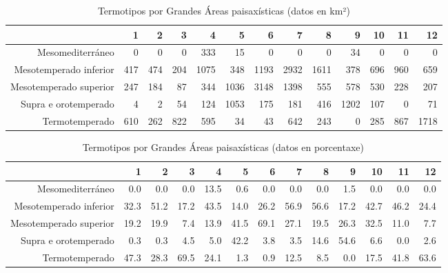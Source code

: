 \begin{table}[p]
\centering
\caption{Termotipos por Grandes Áreas paisaxísticas (datos en km²)} 
\label{xtaboa3}
\begin{tabular}{rrrrrrrrrrrrr}
  \hline
 & 1 & 2 & 3 & 4 & 5 & 6 & 7 & 8 & 9 & 10 & 11 & 12 \\ 
  \hline
Mesomediterráneo & 0 & 0 & 0 & 333 & 15 & 0 & 0 & 0 & 34 & 0 & 0 & 0 \\ 
  Mesotemperado inferior & 417 & 474 & 204 & 1075 & 348 & 1193 & 2932 & 1611 & 378 & 696 & 960 & 659 \\ 
  Mesotemperado superior & 247 & 184 & 87 & 344 & 1036 & 3148 & 1398 & 555 & 578 & 530 & 228 & 207 \\ 
  Supra e orotemperado & 4 & 2 & 54 & 124 & 1053 & 175 & 181 & 416 & 1202 & 107 & 0 & 71 \\ 
  Termotemperado & 610 & 262 & 822 & 595 & 34 & 43 & 642 & 243 & 0 & 285 & 867 & 1718 \\ 
   \hline
\end{tabular}
\end{table}
\begin{table}[p]
\centering
\caption{Termotipos por Grandes Áreas paisaxísticas (datos en porcentaxe)} 
\label{xtaboa3p}
\begin{tabular}{rrrrrrrrrrrrr}
  \hline
 & 1 & 2 & 3 & 4 & 5 & 6 & 7 & 8 & 9 & 10 & 11 & 12 \\ 
  \hline
Mesomediterráneo & 0.0 & 0.0 & 0.0 & 13.5 & 0.6 & 0.0 & 0.0 & 0.0 & 1.5 & 0.0 & 0.0 & 0.0 \\ 
  Mesotemperado inferior & 32.3 & 51.2 & 17.2 & 43.5 & 14.0 & 26.2 & 56.9 & 56.6 & 17.2 & 42.7 & 46.2 & 24.4 \\ 
  Mesotemperado superior & 19.2 & 19.9 & 7.4 & 13.9 & 41.5 & 69.1 & 27.1 & 19.5 & 26.3 & 32.5 & 11.0 & 7.7 \\ 
  Supra e orotemperado & 0.3 & 0.3 & 4.5 & 5.0 & 42.2 & 3.8 & 3.5 & 14.6 & 54.6 & 6.6 & 0.0 & 2.6 \\ 
  Termotemperado & 47.3 & 28.3 & 69.5 & 24.1 & 1.3 & 0.9 & 12.5 & 8.5 & 0.0 & 17.5 & 41.8 & 63.6 \\ 
   \hline
\end{tabular}
\end{table}
